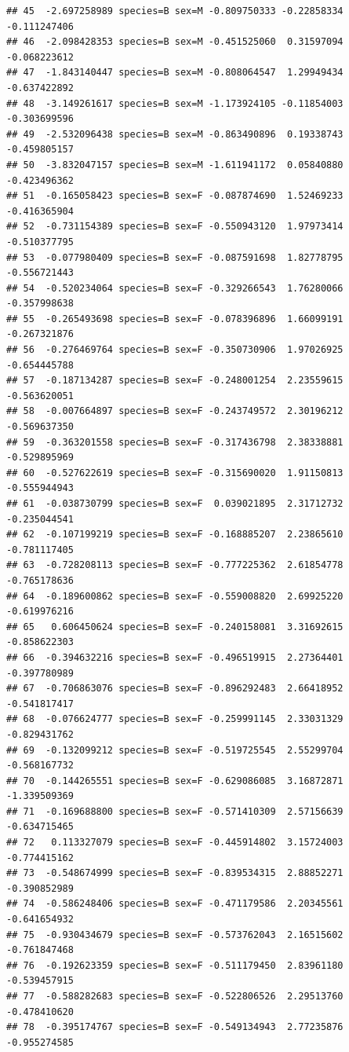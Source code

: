 \documentclass{beamer}\usepackage[]{graphicx}\usepackage[]{color}
\makeatletter
\newenvironment{kframe}{%
 \def\at@end@of@kframe{}%
 \ifinner\ifhmode%
  \def\at@end@of@kframe{\end{minipage}}%
  \begin{minipage}{\columnwidth}%
 \fi\fi%
 \def\FrameCommand##1{\hskip\@totalleftmargin \hskip-\fboxsep
 \colorbox{shadecolor}{##1}\hskip-\fboxsep
     \hskip-\linewidth \hskip-\@totalleftmargin \hskip\columnwidth}%
 \MakeFramed {\advance\hsize-\width
   \@totalleftmargin\z@ \linewidth\hsize
   \@setminipage}}%
 {\par\unskip\endMakeFramed%
 \at@end@of@kframe}
\newenvironment{knitrout}{}{} %
\makeatother
\begin{document}
\begin{frame}[fragile]
\begin{knitrout}
\begin{kframe}
\begin{verbatim}
## 45  -2.697258989 species=B sex=M -0.809750333 -0.22858334    -0.111247406
## 46  -2.098428353 species=B sex=M -0.451525060  0.31597094    -0.068223612
## 47  -1.843140447 species=B sex=M -0.808064547  1.29949434    -0.637422892
## 48  -3.149261617 species=B sex=M -1.173924105 -0.11854003    -0.303699596
## 49  -2.532096438 species=B sex=M -0.863490896  0.19338743    -0.459805157
## 50  -3.832047157 species=B sex=M -1.611941172  0.05840880    -0.423496362
## 51  -0.165058423 species=B sex=F -0.087874690  1.52469233    -0.416365904
## 52  -0.731154389 species=B sex=F -0.550943120  1.97973414    -0.510377795
## 53  -0.077980409 species=B sex=F -0.087591698  1.82778795    -0.556721443
## 54  -0.520234064 species=B sex=F -0.329266543  1.76280066    -0.357998638
## 55  -0.265493698 species=B sex=F -0.078396896  1.66099191    -0.267321876
## 56  -0.276469764 species=B sex=F -0.350730906  1.97026925    -0.654445788
## 57  -0.187134287 species=B sex=F -0.248001254  2.23559615    -0.563620051
## 58  -0.007664897 species=B sex=F -0.243749572  2.30196212    -0.569637350
## 59  -0.363201558 species=B sex=F -0.317436798  2.38338881    -0.529895969
## 60  -0.527622619 species=B sex=F -0.315690020  1.91150813    -0.555944943
## 61  -0.038730799 species=B sex=F  0.039021895  2.31712732    -0.235044541
## 62  -0.107199219 species=B sex=F -0.168885207  2.23865610    -0.781117405
## 63  -0.728208113 species=B sex=F -0.777225362  2.61854778    -0.765178636
## 64  -0.189600862 species=B sex=F -0.559008820  2.69925220    -0.619976216
## 65   0.606450624 species=B sex=F -0.240158081  3.31692615    -0.858622303
## 66  -0.394632216 species=B sex=F -0.496519915  2.27364401    -0.397780989
## 67  -0.706863076 species=B sex=F -0.896292483  2.66418952    -0.541817417
## 68  -0.076624777 species=B sex=F -0.259991145  2.33031329    -0.829431762
## 69  -0.132099212 species=B sex=F -0.519725545  2.55299704    -0.568167732
## 70  -0.144265551 species=B sex=F -0.629086085  3.16872871    -1.339509369
## 71  -0.169688800 species=B sex=F -0.571410309  2.57156639    -0.634715465
## 72   0.113327079 species=B sex=F -0.445914802  3.15724003    -0.774415162
## 73  -0.548674999 species=B sex=F -0.839534315  2.88852271    -0.390852989
## 74  -0.586248406 species=B sex=F -0.471179586  2.20345561    -0.641654932
## 75  -0.930434679 species=B sex=F -0.573762043  2.16515602    -0.761847468
## 76  -0.192623359 species=B sex=F -0.511179450  2.83961180    -0.539457915
## 77  -0.588282683 species=B sex=F -0.522806526  2.29513760    -0.478410620
## 78  -0.395174767 species=B sex=F -0.549134943  2.77235876    -0.955274585

\end{verbatim}
\end{kframe}
\end{knitrout}
\end{frame}
\end{document}
